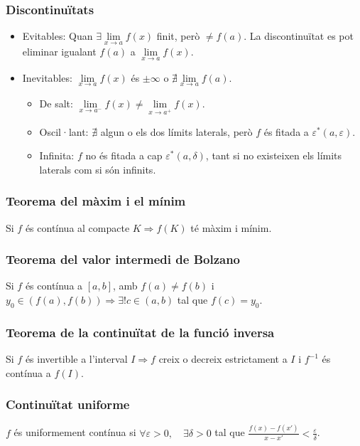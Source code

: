\subsubsection*{Discontinuïtats}
\begin{itemize}
    \item Evitables: Quan $\exists \lim\limits_{x \to a} f(x)$ finit, però $\neq f(a)$. La discontinuïtat es pot eliminar igualant $f(a)$ a $\lim\limits_{x \to a} f(x)$.
    \item Inevitables: $\lim\limits_{x \to a} f(x)$ és $\pm \infty$ o $\nexists \lim\limits_{x \to a} f(a)$.
    \begin{itemize}
        \item De salt: $\lim\limits_{x \to a^{-}} f(x) \neq \lim\limits_{x \to a^{+}} f(x)$.
        \item Oscil·lant: $\nexists$ algun o els dos límits laterals, però $f$ és fitada a $\varepsilon ^{\ast} (a, \varepsilon)$.
        \item Infinita: $f$ no és fitada a cap $\varepsilon ^{\ast} (a, \delta)$, tant si no existeixen els límits laterals com si són infinits.
    \end{itemize}
\end{itemize}

\subsubsection*{Teorema del màxim i el mínim}
Si $f$ és contínua al compacte $K \Rightarrow f(K)$ té màxim i mínim.

\subsubsection*{Teorema del valor intermedi de Bolzano}
Si $f$ és contínua a $[a,b]$, amb $f(a) \neq f(b)$ i $y_{0} \in (f(a),f(b)) \Rightarrow \exists! c \in (a,b)$ tal que $f(c) = y_{0}$. 

\subsubsection*{Teorema de la continuïtat de la funció inversa}
Si $f$ és invertible a l'interval $I \Rightarrow f$ creix o decreix estrictament a $I$ i $f^{-1}$ és contínua a $f(I)$.

\subsubsection*{Continuïtat uniforme}
$f$ és uniformement contínua si $\forall \varepsilon > 0, \quad \exists \delta > 0$ tal que $\frac{f(x) - f(x')}{x - x'} < \frac{\varepsilon}{\delta}$.

